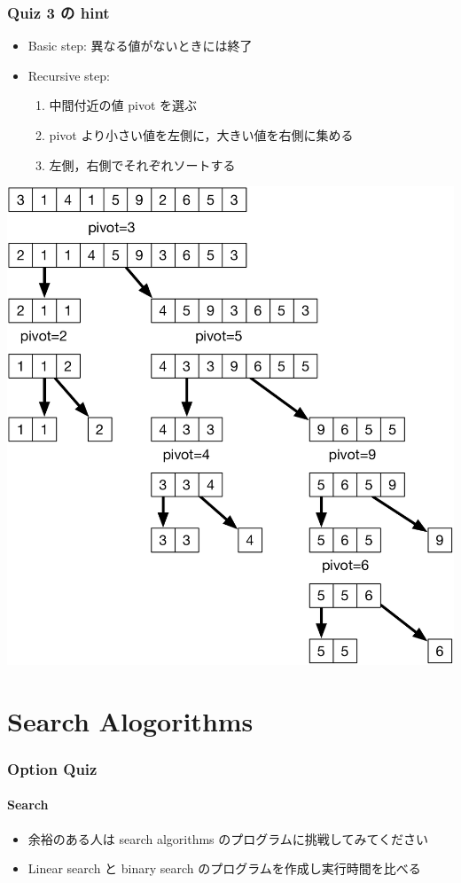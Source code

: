 \begin{frame}[shrink]
\frametitle{Quiz 3 の hint}
  \begin{itemize}
\scriptsize
\item Basic step: 異なる値がないときには終了
\item Recursive step:
    \begin{enumerate}
\scriptsize
\item 中間付近の値 pivot を選ぶ
\item pivot より小さい値を左側に，大きい値を右側に集める
\item 左側，右側でそれぞれソートする
    \end{enumerate}
  \end{itemize}
  \begin{center}
\includegraphics[scale=0.3]{./Figure/quick_sort.pdf}
  \end{center}
\end{frame}
\section{Search Alogorithms}
\begin{frame}
\frametitle{Option Quiz}
\framesubtitle{Search}
  \begin{itemize}
\item 余裕のある人は search algorithms のプログラムに挑戦してみてください
\item Linear search と binary search のプログラムを作成し実行時間を比べる
  \end{itemize}
\end{frame}
%
%
